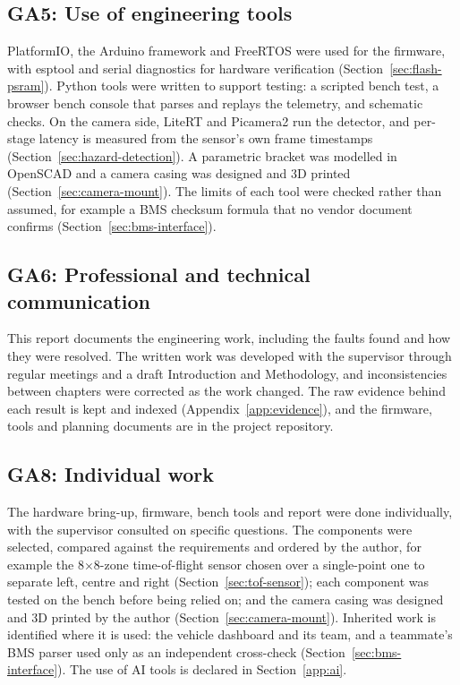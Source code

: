 \subsection*{GA5: Use of engineering tools}
PlatformIO, the Arduino framework and FreeRTOS were used for the firmware, with esptool and serial diagnostics for hardware verification (Section~\ref{sec:flash-psram}). Python tools were written to support testing: a scripted bench test, a browser bench console that parses and replays the telemetry, and schematic checks. On the camera side, LiteRT and Picamera2 run the detector, and per-stage latency is measured from the sensor's own frame timestamps (Section~\ref{sec:hazard-detection}). A parametric bracket was modelled in OpenSCAD and a camera casing was designed and 3D printed (Section~\ref{sec:camera-mount}). The limits of each tool were checked rather than assumed, for example a BMS checksum formula that no vendor document confirms (Section~\ref{sec:bms-interface}).

\subsection*{GA6: Professional and technical communication}
This report documents the engineering work, including the faults found and how they were resolved. The written work was developed with the supervisor through regular meetings and a draft Introduction and Methodology, and inconsistencies between chapters were corrected as the work changed. The raw evidence behind each result is kept and indexed (Appendix~\ref{app:evidence}), and the firmware, tools and planning documents are in the project repository.

\subsection*{GA8: Individual work}
The hardware bring-up, firmware, bench tools and report were done individually, with the supervisor consulted on specific questions. The components were selected, compared against the requirements and ordered by the author, for example the 8$\times$8-zone time-of-flight sensor chosen over a single-point one to separate left, centre and right (Section~\ref{sec:tof-sensor}); each component was tested on the bench before being relied on; and the camera casing was designed and 3D printed by the author (Section~\ref{sec:camera-mount}). Inherited work is identified where it is used: the vehicle dashboard and its team, and a teammate's BMS parser used only as an independent cross-check (Section~\ref{sec:bms-interface}). The use of AI tools is declared in Section~\ref{app:ai}.

